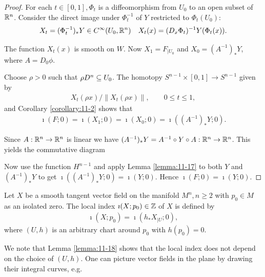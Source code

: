 \begin{proof}
For each $t\in [0,1], \Phi_t$ is a diffeomorphism from $U_0$ to an open subset of $\mathbb{R}^n$.
Consider the direct image under $\Phi_t^{-1}$ of $Y$ restricted to $\Phi_t(U_0)$:
\begin{align*}
  X_t = (\Phi_t^{-1})_*Y\in C^\infty(U_0, \mathbb{R}^n) && 
  X_t(x) = (D_x\Phi_t)^{-1}Y(\Phi_t(x)).
\end{align*}

The function $X_t(x)$ is smooth on $W$. Now $X_1 = F_{|U_0}$ and $X_0 = (A^{-1})_*Y$,
where $A = D_0\phi$.

Choose $\rho>0$ such that $\rho D^n \subseteq U_0$. The homotopy $S^{n-1}\times[0, 1]\to S^{n-1}$
given by 
\begin{align*}
  X_t(\rho x)\big/ \|X_t(\rho x)\|, \qquad 0\le t\le 1,
\end{align*}
and Corollary \ref{corollary:11-2} shows that 
\begin{align*}
  \imath(F; 0)
  = \imath(X_1; 0)
  = \imath(X_0; 0)
  = \imath((A^{-1})_*Y; 0).
\end{align*}

Since $A:\mathbb{R}^n\to\mathbb{R}^n$ is linear we have $(A^{-1})_*Y = A^{-1}\circ Y\circ A:\mathbb{R}^n\to\mathbb{R}^n$. This 
yields the commutative diagram 
\begin{center}
\end{center}
Now use the function $H^{n-1}$ and apply Lemma \ref{lemma:11-17} to both $Y$ and $(A^{-1})_*Y$ to 
get $\imath((A^{-1})_*Y; 0) = \imath(Y; 0)$. Hence $\imath(F; 0) = \imath(Y; 0)$.
\end{proof}

\begin{definition}\label{def:11-19}
  Let $X$ be a smooth tangent vector field on the manifold $M^n, n\ge 2$ with $p_0\in M$ as 
  an isolated zero. The local index $\imath(X; p_0)\in\mathbb{Z}$ of $X$ is defined by
  \begin{align*}
    \imath(X; p_0) = \imath(h_*X_{|U}; 0),
  \end{align*}
  where $(U, h)$ is an arbitrary chart around $p_0$ with $h(p_0) = 0$.
\end{definition}

We note that Lemma \ref{lemma:11-18} shows that the local index does not depend on the
choice of $(U, h)$. One can picture vector fields in the plane by drawing their
integral curves, e.g.

